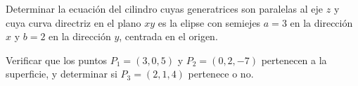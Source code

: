 Determinar la ecuación del cilindro cuyas generatrices son paralelas al eje $z$ y cuya curva directriz en el plano $xy$ es la elipse con semiejes $a = 3$ en la dirección $x$ y $b = 2$ en la dirección $y$, centrada en el origen.

Verificar que los puntos $P_1 = (3, 0, 5)$ y $P_2 = (0, 2, -7)$ pertenecen a la superficie, y determinar si $P_3 = (2, 1, 4)$ pertenece o no.